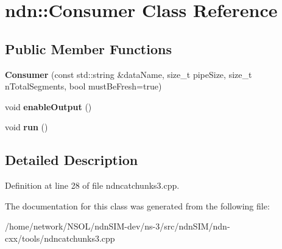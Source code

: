 \hypertarget{classndn_1_1Consumer}{}\section{ndn\+:\+:Consumer Class Reference}
\label{classndn_1_1Consumer}
\subsection*{Public Member Functions}
\begin{DoxyCompactItemize}
\item 
{\bfseries Consumer} (const std\+::string \&data\+Name, size\+\_\+t pipe\+Size, size\+\_\+t n\+Total\+Segments, bool must\+Be\+Fresh=true)\hypertarget{classndn_1_1Consumer_acee5dc1115546a74119c037d0fa14250}{}\label{classndn_1_1Consumer_acee5dc1115546a74119c037d0fa14250}

\item 
void {\bfseries enable\+Output} ()\hypertarget{classndn_1_1Consumer_a6d143a1154a3542c1f47f799213b28c6}{}\label{classndn_1_1Consumer_a6d143a1154a3542c1f47f799213b28c6}

\item 
void {\bfseries run} ()\hypertarget{classndn_1_1Consumer_a95dbc98f0afd7af787ff97ee8296750a}{}\label{classndn_1_1Consumer_a95dbc98f0afd7af787ff97ee8296750a}

\end{DoxyCompactItemize}


\subsection{Detailed Description}


Definition at line 28 of file ndncatchunks3.\+cpp.



The documentation for this class was generated from the following file\+:\begin{DoxyCompactItemize}
\item 
/home/network/\+N\+S\+O\+L/ndn\+S\+I\+M-\/dev/ns-\/3/src/ndn\+S\+I\+M/ndn-\/cxx/tools/ndncatchunks3.\+cpp\end{DoxyCompactItemize}
